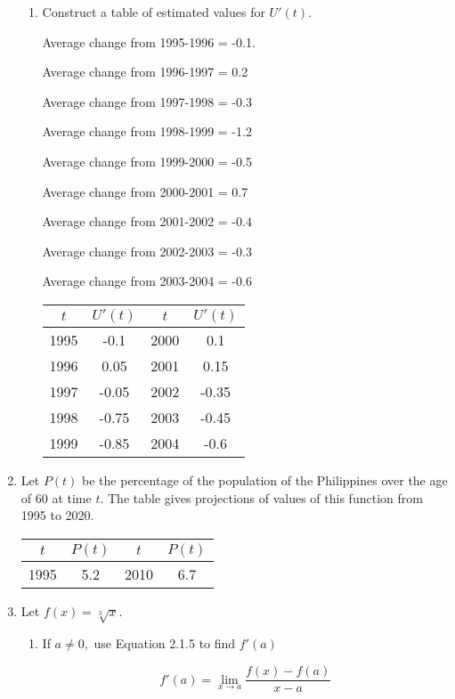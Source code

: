 \documentclass{article}
\begin{document}
\begin{enumerate}
\begin{enumerate}
			\item Construct a table of estimated values for $U'(t)$.

			Average change from 1995-1996 = -0.1.

			Average change from 1996-1997 = 0.2

			Average change from 1997-1998 = -0.3

			Average change from 1998-1999 = -1.2

			Average change from 1999-2000 = -0.5

			Average change from 2000-2001 = 0.7

			Average change from 2001-2002 = -0.4

			Average change from 2002-2003 = -0.3

			Average change from 2003-2004 = -0.6

			\begin{tabular}{|c|c||c|c|}

				\hline
				$t$ & $U'(t)$ & $t$ & $U'(t)$ \\
				\hline
				1995 & -0.1 & 2000 & 0.1 \\
				1996 & 0.05 & 2001 & 0.15 \\
				1997 & -0.05 & 2002 & -0.35 \\
				1998 & -0.75 & 2003 & -0.45 \\
				1999 & -0.85 & 2004 & -0.6 \\
				\hline
			\end{tabular}
		\end{enumerate}

		\item Let $P(t)$ be the percentage of the population of the Philippines over
				the age of 60 at time $t$. The table gives projections of
				values of this function from 1995 to 2020.

			\begin{tabular}{|c|c||c|c|}
				\hline
				$t$ & $P(t)$ & $t$ & $P(t)$ \\
				\hline
				1995 & 5.2 & 2010 & 6.7 \\
			 	\hline
			\end{tabular}

		\item Let $f(x) = \sqrt[3]{x}$.

		\begin{enumerate}
			\item If $a \ne 0,$ use Equation 2.1.5 to find $f'(a)$

				$$f'(a) = \lim \limits _{x \to a} \frac{f(x) - f(a)}{x-a}$$


\end{enumerate}
\end{enumerate}
\end{document}

